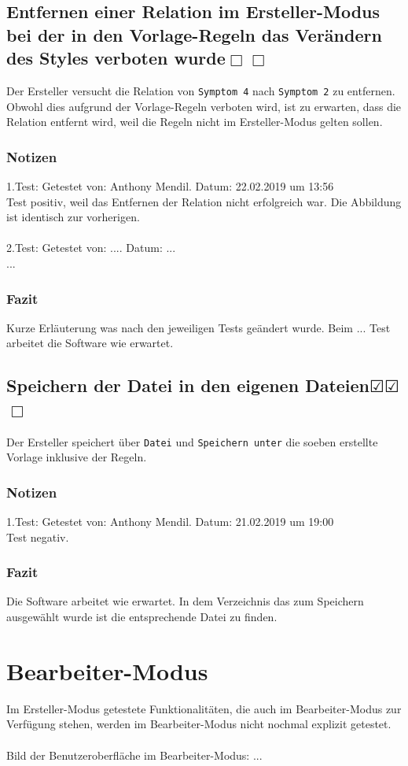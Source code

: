\documentclass{scrartcl}
\newcommand{\subsectiont}[2]{\subsection[#1]{#1{\normalsize\normalfont #2}}}
\newcommand{\leer}{$\Box$}
\newcommand{\ok}{$\CheckedBox$}
\begin{document}
\subsectiont{Entfernen einer Relation im Ersteller-Modus bei der in den Vorlage-Regeln das Verändern des Styles verboten wurde}{\dotfill\XBox\leer\leer}
Der Ersteller versucht die Relation von \texttt{Symptom 4} nach \texttt{Symptom 2} zu entfernen. Obwohl dies aufgrund der Vorlage-Regeln verboten wird, ist zu erwarten, dass die Relation entfernt wird, weil die Regeln nicht im Ersteller-Modus gelten sollen.
\subsubsection{Notizen}
1.Test: Getestet von: Anthony Mendil. Datum: 22.02.2019 um 13:56 \\
Test positiv, weil das Entfernen der Relation nicht erfolgreich war. Die Abbildung ist identisch zur vorherigen. \\ \\
2.Test: Getestet von: .... Datum: ... \\
...
\subsubsection{Fazit}
Kurze Erläuterung was nach den jeweiligen Tests geändert wurde. Beim ... Test arbeitet die Software wie erwartet. 

\subsectiont{Speichern der Datei in den eigenen Dateien}{\dotfill\ok\ok\leer}
Der Ersteller speichert über \texttt{Datei} und \texttt{Speichern unter} die soeben erstellte Vorlage inklusive der Regeln. 
\subsubsection{Notizen}
1.Test: Getestet von: Anthony Mendil. Datum: 21.02.2019 um 19:00 \\
Test negativ.
\subsubsection{Fazit}
Die Software arbeitet wie erwartet. In dem Verzeichnis das zum Speichern ausgewählt wurde ist die entsprechende Datei zu finden. 

\section{Bearbeiter-Modus}
Im Ersteller-Modus getestete Funktionalitäten, die auch im Bearbeiter-Modus zur Verfügung stehen, werden im Bearbeiter-Modus nicht nochmal explizit getestet. \\ \\ Bild der Benutzeroberfläche im Bearbeiter-Modus:
... 
\end{document}
